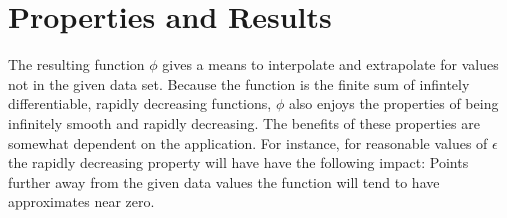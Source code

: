 \documentclass{article}
\begin{document}
\section*{Properties and Results}
The resulting function $\phi$ gives a means to interpolate and extrapolate for values not in the given data set.
Because the function is the finite sum of infintely differentiable, rapidly decreasing functions, $\phi$ also 
enjoys the properties of being infinitely smooth and rapidly decreasing. The benefits of these properties
are somewhat dependent on the application. For instance, for reasonable values of $\epsilon$ the rapidly 
decreasing property will have have the following impact: Points further away from the given data values
the function will tend to have approximates near zero. 
\end{document}
